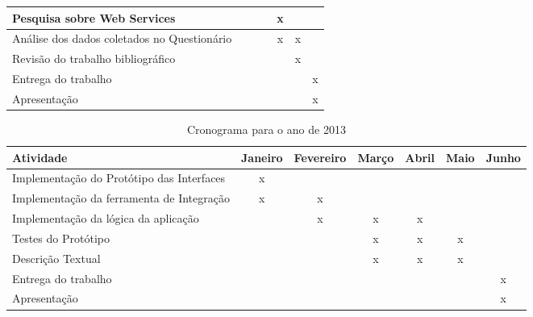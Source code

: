\begin{table}[!hbt]
\begin{tabular}{|p{5cm}|c|c|c|c|c|c|}
  Pesquisa sobre Web Services                                                                           &&&&x&&           \\ \hline
  Análise dos dados coletados no Questionário                                                                           &&&&x&x&           \\ \hline
  Revisão do trabalho bibliográfico                                                                     &&&&&x&           \\ \hline
  Entrega do trabalho                                                                                             &&&&&&x      \\ \hline
  Apresentação                                                                                                        &&&&&&x      \\ \hline
\end{tabular}
\end{table}

\begin{table}[!htb]
\caption[Cronograma 2013]{Cronograma para o ano de 2013}
\begin{tabular}{|p{5cm}|c|c|c|c|c|c|}\hline
  Atividade                                                                                                                 & Janeiro & Fevereiro & Março & Abril & Maio & Junho  \\ \hline
  Implementação do Protótipo das Interfaces                                                     &x&&&&& \\ \hline
  Implementação da ferramenta de Integração                                                  &x&x&&&& \\ \hline
  Implementação da lógica da aplicação                                                            &&x&x&x&& \\ \hline  
  Testes do Protótipo                                                                                               &&&x&x&x& \\ \hline
  Descrição Textual                                                                                                  &&&x&x&x& \\ \hline           
  Entrega do trabalho                                                                                              &&&&&&x \\ \hline
  Apresentação                                                                                                         &&&&&&x \\ \hline
\end{tabular}
\end{table}